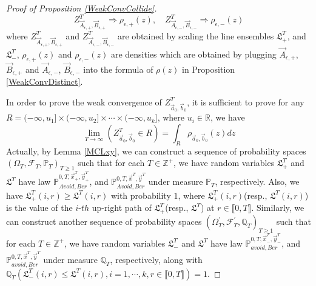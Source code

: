 \begin{proof}[Proof of Proposition \ref{WeakConvCollide}]
$$Z^{T}_{\vec{A}_{\epsilon,+}, \vec{B}_{\epsilon, +}}\Rightarrow \rho_{\epsilon,+}(z),\quad Z^{T}_{\vec{A}_{\epsilon,-}, \vec{B}_{\epsilon, -}}\Rightarrow \rho_{\epsilon,-}(z)$$
where $Z^{T}_{\vec{A}_{\epsilon,+},\vec{B}_{\epsilon,+}}$ and $Z^{T}_{\vec{A}_{\epsilon,-},\vec{B}_{\epsilon,-}}$ are obtained by scaling the line ensembles $\mathfrak{L}_{+}^{T}$, and $\mathfrak{L}_{-}^{T}$, $\rho_{\epsilon,+}(z)$ and $\rho_{\epsilon,-}(z)$ are densities which are obtained by plugging $\vec{A}_{\epsilon,+}$, $\vec{B}_{\epsilon,+}$ and $\vec{A}_{\epsilon,-}$, $\vec{B}_{\epsilon,-}$ into the formula of $\rho(z)$ in Proposition \ref{WeakConvDistinct}.

In order to prove the weak convergence of $Z^{T}_{\vec{a}_{0},\vec{b}_{0}}$, it is sufficient to prove for any $R=(-\infty,u_{1}]\times(-\infty,u_{2}]\times\cdots\times(-\infty,u_{k}]$, where $u_{i}\in\mathbb{R}$, we have $$\lim_{T\rightarrow\infty}(Z^{T}_{\vec{a}_{0},\vec{b}_{0}}\in R)=\int_{R}\rho_{\vec{a}_{0},\vec{b}_{0}}(z)dz$$
Actually, by Lemma \ref{MCLxy}, we can construct a sequence of probability spaces $(\Omega_{T},\mathcal{F}_{T},\mathbb{P}_{T})_{T\geq 1}$ such that for each $T\in\mathbb{Z}^{+}$, we have random variables $\mathfrak{L}_{+}^{T}$ and $\mathfrak{L}^{T}$ have law $\mathbb{P}_{Avoid,Ber}^{0,T,\vec{x}^{T}_{+},\vec{y}^{T}_{+}}$, and $\mathbb{P}_{Avoid,Ber}^{0,T,\vec{x}^{T},\vec{y}^{T}}$ under measure $\mathbb{P}_{T}$, respectively. Also, we have $\mathfrak{L}_{+}^{T}(i,r)\geq \mathfrak{L}^{T}(i,r)$ with probability $1$, where $\mathfrak{L}_{+}^{T}(i,r)$(resp., $\mathfrak{L}^{T}(i,r)$) is the value of the $i$-$th$ up-right path of $\mathfrak{L}_{+}^{T}$(resp., $\mathfrak{L}^{T}$) at $r\in\llbracket 0,T\rrbracket$. Similarly, we can construct another sequence of probability spaces $(\Omega_{T}^{\prime},\mathcal{F}_{T}^{\prime},\mathbb{Q}_{T})_{T\geq 1}$ such that for each $T\in\mathbb{Z}^{+}$, we have random variables $\mathfrak{L}_{-}^{T}$ and $\mathfrak{L}^{T}$ have law $\mathbb{P}_{avoid,Ber}^{0,T,\vec{x}^{T}_{-},\vec{y}^{T}_{-}}$, and $\mathbb{P}_{avoid,Ber}^{0,T,\vec{x}^{T},\vec{y}^{T}}$ under measure $\mathbb{Q}_{T}$, respectively, along with $\mathbb{Q}_{T}(\mathfrak{L}_{-}^{T}(i,r)\leq \mathfrak{L}^{T}(i,r), i=1,\cdots, k, r\in\llbracket 0,T\rrbracket)=1$.


\end{proof}
